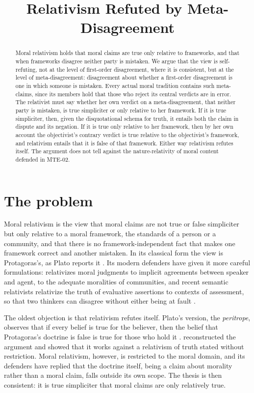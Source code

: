 \documentclass{situationist-preprint}
\title{Relativism Refuted by Meta-Disagreement}
\begin{document}
\maketitle

\begin{abstract}
Moral relativism holds that moral claims are true only relative to frameworks, and that when frameworks disagree neither party is mistaken. We argue that the view is self-refuting, not at the level of first-order disagreement, where it is consistent, but at the level of meta-disagreement: disagreement about whether a first-order disagreement is one in which someone is mistaken. Every actual moral tradition contains such meta-claims, since its members hold that those who reject its central verdicts are in error. The relativist must say whether her own verdict on a meta-disagreement, that neither party is mistaken, is true simpliciter or only relative to her framework. If it is true simpliciter, then, given the disquotational schema for truth, it entails both the claim in dispute and its negation. If it is true only relative to her framework, then by her own account the objectivist's contrary verdict is true relative to the objectivist's framework, and relativism entails that it is false of that framework. Either way relativism refutes itself. The argument does not tell against the nature-relativity of moral content defended in MTE-02.
\end{abstract}

\section{The problem}

Moral relativism is the view that moral claims are not true or false simpliciter but only relative to a moral framework, the standards of a person or a community, and that there is no framework-independent fact that makes one framework correct and another mistaken. In its classical form the view is Protagoras's, as Plato reports it \citep[152a]{Theaetetus}. Its modern defenders have given it more careful formulations: \citet{Harman1975} relativizes moral judgments to implicit agreements between speaker and agent, \citet{Wong1984,Wong2006} to the adequate moralities of communities, and recent semantic relativists relativize the truth of evaluative assertions to contexts of assessment, so that two thinkers can disagree without either being at fault \citep{Kolbel2004,MacFarlane2014}.

The oldest objection is that relativism refutes itself. Plato's version, the \emph{peritrope}, observes that if every belief is true for the believer, then the belief that Protagoras's doctrine is false is true for those who hold it \citep[170e--171c]{Theaetetus}. \citet{Burnyeat1976} reconstructed the argument and showed that it works against a relativism of truth stated without restriction. Moral relativism, however, is restricted to the moral domain, and its defenders have replied that the doctrine itself, being a claim about morality rather than a moral claim, falls outside its own scope. The thesis is then consistent: it is true simpliciter that moral claims are only relatively true.
\end{document}
